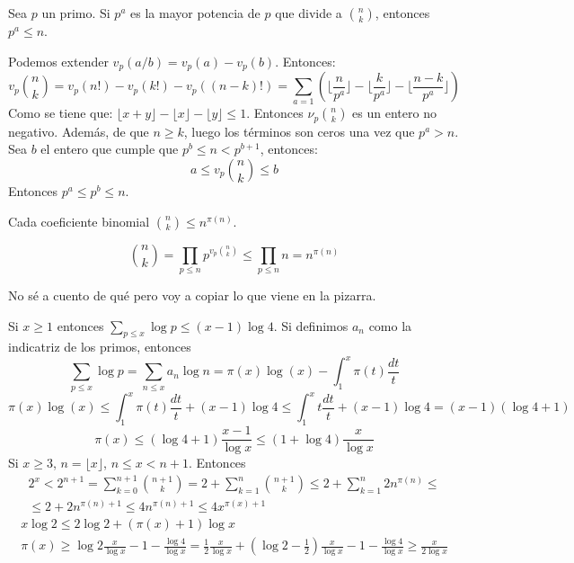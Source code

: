 \documentclass[TAN.tex]{subfiles}
\begin{document}
\begin{lemma}
Sea $p$ un primo. Si $p^a$ es la mayor potencia de $p$ que divide a $\binom{n}{k}$, entonces $p^a ≤ n$.
\end{lemma}
\begin{dem}
Podemos extender $v_p(a/b) = v_p(a)-v_p(b)$. Entonces:
\[ v_p\binom{n}{k} = v_p(n!) - v_p(k!) - v_p((n-k)!) = \sum_{a=1} \left(\lfloor \frac{n}{p^a} \rfloor - \lfloor \frac{k}{p^a}\rfloor - \lfloor \frac{n-k}{p^a} \rfloor\right) \]
Como se tiene que: $\lfloor x+y \rfloor -\lfloor x\rfloor - \lfloor y \rfloor ≤ 1$. Entonces $ν_p\binom{n}{k}$ es un entero no negativo. Además, de que $n ≥ k$, luego los términos son ceros una vez que $p^a>n$. Sea $b$ el entero que cumple que $p^b ≤ n < p^{b+1}$, entonces:
\[ a ≤ v_p\binom{n}{k} ≤ b \]
Entonces $p^a≤p^b≤n$.
\end{dem}

\begin{coro}
Cada coeficiente binomial $\binom{n}{k} ≤ n^{π(n)}$.
\end{coro}
\begin{dem}
\[ \binom{n}{k} = \prod_{p≤n} p^{v_p\binom{n}{k}} ≤ \prod_{p≤n} n = n^{π(n)} \]
\end{dem}

No sé a cuento de qué pero voy a copiar lo que viene en la pizarra.

Si $x\geq 1$ entonces $\sum_{p\leq x} \log p \leq (x-1) \log 4$. Si definimos $a_n$ como la indicatriz de los primos, entonces 
$$\sum_{p\leq x} \log p = \sum_{n\leq x}a_n \log n = \pi(x)\log(x)-\int_1^x \pi(t)\frac{dt}{t}$$
$$\pi(x)\log(x) \leq \int_1^x \pi(t)\frac{dt}{t} + (x-1)\log 4
\leq \int_1^x t\frac{dt}{t} + (x-1)\log4 = (x-1)(\log4 +1)$$
$$ \pi(x)\leq (\log 4 +1) \frac{x-1}{\log x}\leq (1+\log 4)\frac{x}{\log x}$$
Si $x\geq 3$, $n=\lfloor x \rfloor$, $n\leq x < n+1$. Entonces
\begin{gather*}
2^x < 2^{n+1} = \sum_{k=0}^{n+1}\binom{n+1}{k} = 2+ \sum_{k=1}^n \binom{n+1}{k} \leq 2 + \sum_{k=1}^n 2n^{\pi(n)} \leq\\
\leq 2+2n^{\pi(n)+1} \leq 4n^{\pi(n)+1}\leq 4x^{\pi(x)+1}
\end{gather*}
\begin{gather*}
x \log 2 \leq 2\log 2 + (\pi(x)+1)\log x\\
 \pi(x) \geq \log 2 \frac{x}{\log x} -1 -\frac{\log 4}{\log x} = \frac{1}{2}\frac{x}{\log x} +  (\log 2 - \frac{1}{2})\frac{x}{\log x} -1 - \frac{\log4}{\log x} \geq \frac{x}{2\log{x}}
	\end{gather*}
\end{document}

